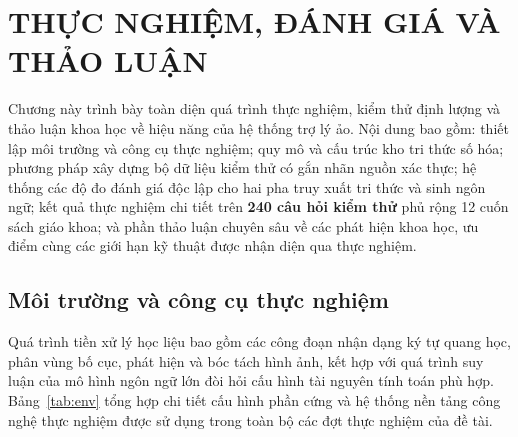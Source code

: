 \chapter{THỰC NGHIỆM, ĐÁNH GIÁ VÀ THẢO LUẬN}
\label{chapter:thuc_nghiem_danh_gia}

Chương này trình bày toàn diện quá trình thực nghiệm, kiểm thử định lượng và thảo luận khoa học về hiệu năng của hệ thống trợ lý ảo. Nội dung bao gồm: thiết lập môi trường và công cụ thực nghiệm; quy mô và cấu trúc kho tri thức số hóa; phương pháp xây dựng bộ dữ liệu kiểm thử có gắn nhãn nguồn xác thực; hệ thống các độ đo đánh giá độc lập cho hai pha truy xuất tri thức và sinh ngôn ngữ; kết quả thực nghiệm chi tiết trên \textbf{240 câu hỏi kiểm thử} phủ rộng 12 cuốn sách giáo khoa; và phần thảo luận chuyên sâu về các phát hiện khoa học, ưu điểm cùng các giới hạn kỹ thuật được nhận diện qua thực nghiệm.

\section{Môi trường và công cụ thực nghiệm}
Quá trình tiền xử lý học liệu bao gồm các công đoạn nhận dạng ký tự quang học, phân vùng bố cục, phát hiện và bóc tách hình ảnh, kết hợp với quá trình suy luận của mô hình ngôn ngữ lớn đòi hỏi cấu hình tài nguyên tính toán phù hợp. Bảng~\ref{tab:env} tổng hợp chi tiết cấu hình phần cứng và hệ thống nền tảng công nghệ thực nghiệm được sử dụng trong toàn bộ các đợt thực nghiệm của đề tài.

